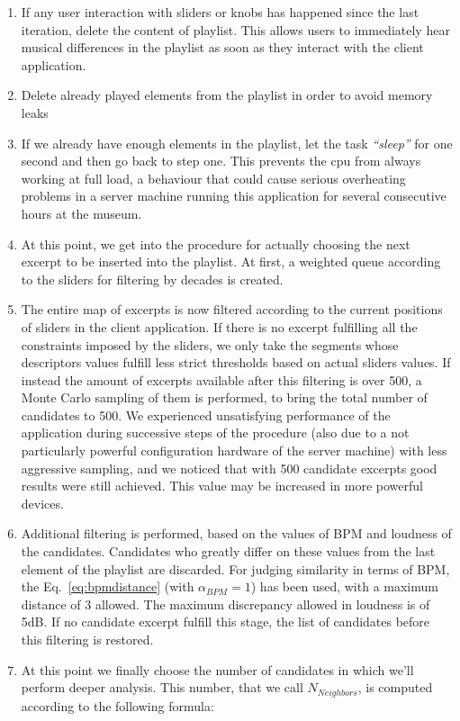 \begin{enumerate}
\item If any user interaction with sliders or knobs has happened since the last iteration, delete the content of playlist. This allows users to immediately hear musical differences in the playlist as soon as they interact with the client application. 
\item Delete already played elements from the playlist in order to avoid memory leaks
\item If we already have enough elements in the playlist, let the task \textit{``sleep''} for one second and then go back to step one. This prevents the cpu from always working at full load, a behaviour that could cause serious overheating problems in a server machine running this application for several consecutive hours at the museum.
\item At this point, we get into the procedure for actually choosing the next excerpt to be inserted into the playlist. At first, a weighted queue according to the sliders for filtering by decades is created.
\item The entire map of excerpts is now filtered according to the current positions of sliders in the client application. If there is no excerpt fulfilling all the constraints imposed by the sliders, we only take the segments whose descriptors values fulfill less strict thresholds based on actual sliders values. If instead the amount of excerpts available after this filtering is over 500, a Monte Carlo sampling of them is performed, to bring the total number of candidates to 500. We experienced unsatisfying performance of the application during successive steps of the procedure (also due to a not particularly powerful configuration hardware of the server machine) with less aggressive sampling, and we noticed that with 500 candidate excerpts good results were still achieved. This value may be increased in more powerful devices. \
\item Additional filtering is performed, based on the values of BPM and loudness of the candidates. Candidates who greatly differ on these values from the last element of the playlist are discarded. For judging similarity in terms of BPM, the Eq.~\ref{eq:bpmdistance} (with $\alpha_{BPM} = 1$) has been used, with a maximum distance of 3 allowed. The maximum discrepancy allowed in loudness is of 5dB. If no candidate excerpt fulfill this stage, the list of candidates before this filtering is restored. 
\item At this point we finally choose the number of candidates in which we'll perform deeper analysis. This number, that we call $N_{Neighbors}$, is computed according to the following formula:

\end{enumerate}
